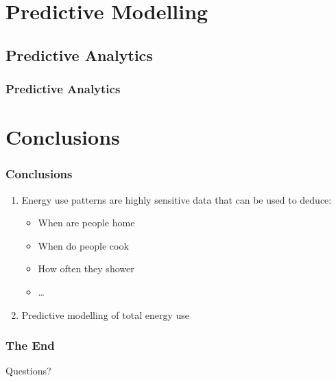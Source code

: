 \documentclass[10pt]{beamer}
\begin{document}
\section{Predictive Modelling}

\subsection{Predictive Analytics}

\begin{frame}
\frametitle{Predictive Analytics}

\end{frame}

\section{Conclusions}


\begin{frame}
\frametitle{Conclusions}

\begin{enumerate}
    \item Energy use patterns are highly sensitive data that can be used to deduce:
    \begin{itemize}
        \pause
        \item When are people home
        \pause
        \item When do people cook
        \pause
        \item How often they shower
        \item \ldots
    \end{itemize}
    \pause
    \item Predictive modelling of total energy use
\end{enumerate}

\end{frame}

\begin{frame}
\frametitle{The End}

\LARGE{\centerline{Questions?}}

\end{frame}

\end{document}

